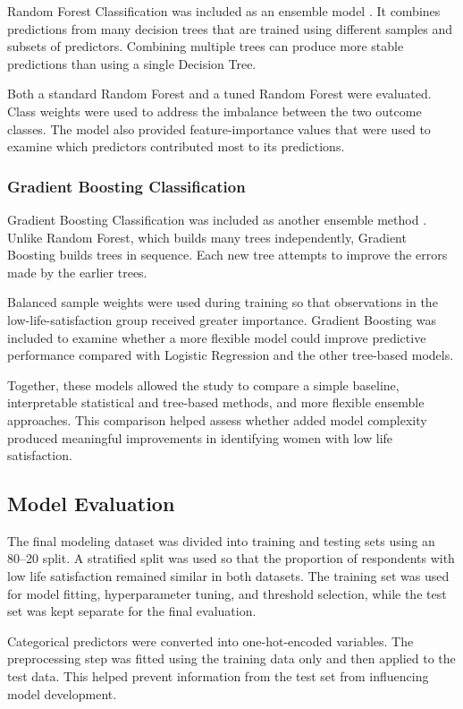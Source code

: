 \documentclass[12pt]{article}
\begin{document}
Random Forest Classification was included as an ensemble model
\citep{breiman2001}. It combines predictions from many decision trees that are trained using different samples and subsets of predictors. Combining multiple trees can produce more stable predictions than using a single Decision Tree.

Both a standard Random Forest and a tuned Random Forest were evaluated. Class weights were used to address the imbalance between the two outcome classes. The model also provided feature-importance values that were used to examine which predictors contributed most to its predictions.

\subsubsection{Gradient Boosting Classification}

Gradient Boosting Classification was included as another ensemble
method \citep{friedman2001}. Unlike Random Forest, which builds many trees independently, Gradient Boosting builds trees in sequence. Each new tree attempts to improve the errors made by the earlier trees.

Balanced sample weights were used during training so that observations in the low-life-satisfaction group received greater importance. Gradient Boosting was included to examine whether a more flexible model could improve predictive performance compared with Logistic Regression and the other tree-based models.

Together, these models allowed the study to compare a simple baseline, interpretable statistical and tree-based methods, and more flexible ensemble approaches. This comparison helped assess whether added model complexity produced meaningful improvements in identifying women with low life satisfaction.

\subsection{Model Evaluation}

The final modeling dataset was divided into training and testing sets using an 80--20 split. A stratified split was used so that the proportion of respondents with low life satisfaction remained similar in both datasets. The training set was used for model fitting, hyperparameter tuning, and threshold selection, while the test set was kept separate for the final evaluation.

Categorical predictors were converted into one-hot-encoded variables. The preprocessing step was fitted using the training data only and then applied to the test data. This helped prevent information from the test set from influencing model development.
\end{document}
